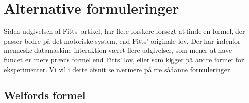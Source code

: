\section*{Alternative formuleringer}
Siden udgivelsen af Fitts’ artikel, har flere forskere forsøgt at finde en formel, der passer bedre på det motoriske system, end Fitts’ originale lov. Der har indenfor menneske-datamaskine interaktion været flere udgivelser, som mener at have fundet en mere præcis formel end Fitts’ lov, eller som kigger på andre former for eksperimenter. Vi vil i dette afsnit se nærmere på tre sådanne formuleringer.

\subsection*{Welfords formel}

